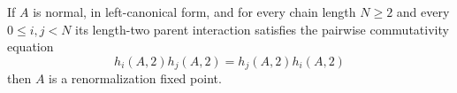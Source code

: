 \begin{theorem}\label{thm:nncph_implies_rfp}
    \leanok
    If $A$ is normal, in left-canonical form, and for every chain length
    $N \ge 2$ and every $0\le i,j<N$ its length-two parent interaction
    satisfies the pairwise commutativity equation
    \[
        h_i(A,2)h_j(A,2)=h_j(A,2)h_i(A,2)
    \]
    then $A$ is a renormalization fixed point.
\end{theorem}
